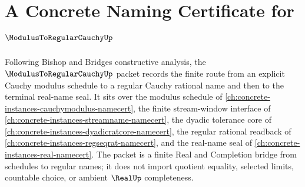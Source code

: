 \chapter{A Concrete Naming Certificate for $\ModulusToRegularCauchyUp$}
\label{ch:concrete-instances-modulus-to-regular-cauchy-namecert}

Following Bishop and Bridges constructive analysis, the $\ModulusToRegularCauchyUp$ packet records the finite route from an explicit Cauchy modulus schedule to a regular Cauchy rational name and then to the terminal real-name seal. It sits over the modulus schedule of \autoref{ch:concrete-instances-cauchymodulus-namecert}, the finite stream-window interface of \autoref{ch:concrete-instances-streamname-namecert}, the dyadic tolerance core of \autoref{ch:concrete-instances-dyadicratcore-namecert}, the regular rational readback of \autoref{ch:concrete-instances-regseqrat-namecert}, and the real-name seal of \autoref{ch:concrete-instances-real-namecert}. The packet is a finite Real and Completion bridge from schedules to regular names; it does not import quotient equality, selected limits, countable choice, or ambient $\RealUp$ completeness.

